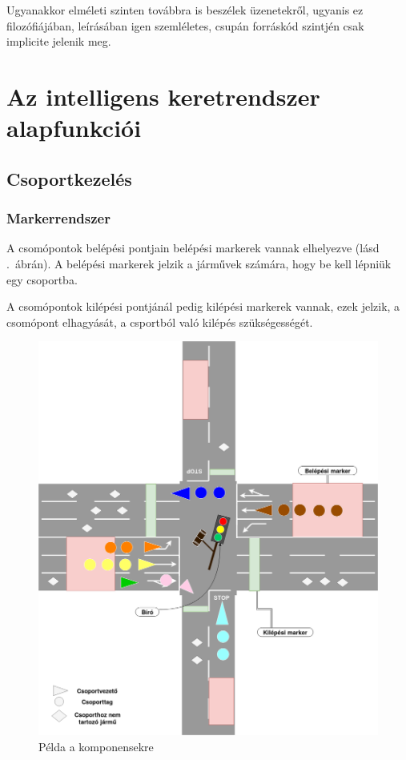\documentclass{article}
\begin{document}
		Ugyanakkor elméleti szinten továbbra is beszélek üzenetekről, ugyanis ez filozófiájában, leírásában igen szemléletes, csupán forráskód szintjén csak implicite jelenik meg.
		
	\section{Az intelligens keretrendszer alapfunkciói}
	\subsection{Csoportkezelés}
		\subsubsection{Markerrendszer}
			A csomópontok belépési pontjain belépési markerek vannak elhelyezve (lásd .~ábrán). A belépési markerek jelzik a járművek számára, hogy be kell lépniük egy csoportba.
			
			A csomópontok kilépési pontjánál pedig kilépési markerek vannak, ezek jelzik, a csomópont elhagyását, a csportból való kilépés szükségességét.
			
			\begin{figure}[h]
				\centering
				\includegraphics[width=1.0\textwidth]{szitu.png} 
				\caption{Példa a komponensekre}
				\label{pic:szitu}
			\end{figure}
			
\end{document}
